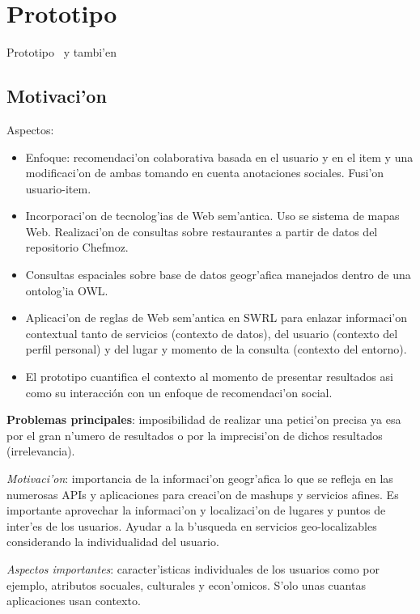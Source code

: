 \documentclass[11pt]{article}
\begin{document}
\section{Prototipo}
Prototipo~\cite{rep1:isra} y tambi'en~\cite{rep2:isra}\\

\subsection{Motivaci'on}
Aspectos:
\begin{itemize}
\item Enfoque: recomendaci'on colaborativa basada en el usuario y en el item y una modificaci'on de ambas tomando en cuenta anotaciones sociales. Fusi'on usuario-item.
\item Incorporaci'on de tecnolog'ias de Web sem'antica. Uso se sistema de mapas Web. Realizaci'on de consultas sobre restaurantes a partir de datos del repositorio Chefmoz. 
\item Consultas espaciales sobre base de datos geogr'afica manejados dentro de una ontolog'ia OWL. 
\item Aplicaci'on de reglas de Web sem'antica en SWRL para enlazar informaci'on contextual tanto de servicios (contexto de datos), del usuario (contexto del perfil personal) y del lugar y momento de la consulta (contexto del entorno).
\item El prototipo cuantifica el contexto al momento de presentar resultados asi como su interacción con un enfoque de recomendaci'on social.
\end{itemize}

\textbf{Problemas principales}: imposibilidad de realizar una petici'on precisa ya esa por el gran n'umero de resultados o por la imprecisi'on de dichos resultados (irrelevancia).

\textit{Motivaci'on}: importancia de la informaci'on geogr'afica lo que se refleja en las numerosas APIs y aplicaciones para creaci'on de mashups y servicios afines. Es importante aprovechar la informaci'on y localizaci'on de lugares y puntos de inter'es de los usuarios. Ayudar a la b'usqueda en servicios geo-localizables considerando la individualidad del usuario.

\textit{Aspectos importantes}: caracter'isticas individuales de los usuarios como por ejemplo, atributos socuales, culturales y econ'omicos. S'olo unas cuantas aplicaciones usan contexto. 
\end{document}
